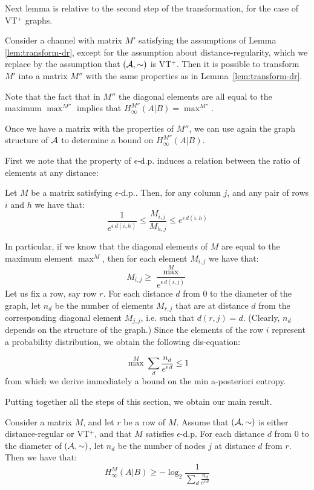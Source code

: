 \documentclass{llncs}
\begin{document}
Next lemma is relative to the second step of the transformation, for the case of VT$^+$ graphs. 
\begin{lemma}\label{lem:transform-vt++}
Consider a channel with matrix $M'$ satisfying the assumptions of Lemma \ref{lem:transform-dr}, except for the assumption about distance-regularity, which we replace by the assumption that $({\cal A}, \sim)$ is VT$^+$. 
Then it is possible to transform $M'$ into a matrix $M''$ with the same properties as in Lemma~\ref{lem:transform-dr}.
\end{lemma}
Note that the fact that in $M''$ the diagonal elements are all equal to the maximum $ \max^{M''}$ implies that $H^{M''}_\infty(A|B) = \max^{M''}$. 

Once we have a matrix with the properties of $M''$, we can use again the graph structure of $\cal A$ to determine a bound on $H^{M''}_\infty(A|B)$. 

First we note that the property of $\epsilon$-d.p. induces a relation between the ratio of elements at any distance: 

\begin{remark}
Let $M$ be a matrix satisfying  $\epsilon$-d.p.. Then, for any column $j$, and any pair of rows $i$ and $h$ we have that:
\[
\frac{1}{e^{\epsilon \,d(i,h)}}\leq \frac{M_{i,j}}{M_{h,j}}\leq e^{\epsilon \,d(i,h)}
\]
\end{remark}
In particular, if we know that the diagonal elements of $M$ are equal to the maximum element $\max^{M}$, then 
for each element $M_{i,j}$ we have that:
\begin{equation}\label{eqn:other-elements}
M_{i,j}\geq \frac{\max^{M}}{\displaystyle e^{\epsilon \,d(i,j)}}
\end{equation}
Let us fix a row, say row $r$. For each distance $d$ from $0$ to the diameter of the graph, let $n_d$ be the number of elements $M_{r,j}$ that are at distance $d$ from the corresponding diagonal element $M_{j,j}$, i.e. such that $d(r,j) = d$. (Clearly, $n_d$ depends on the structure of the graph.) Since the elements of the row $i$ represent a probability distribution, we obtain the following dis-equation: 

\[  {\textstyle \max^{M}} \sum_{d}  \frac{n_d}{e^{\epsilon \,d }} \leq 1\]
from which we derive immediately a bound on the min a-posteriori entropy. 

Putting together all the steps  of this section, we  obtain our main result. 

\begin{theorem}\label{theo:bound}
Consider a matrix $M$, and let $r$ be a row of $M$. Assume that $({\cal A}, \sim)$ is either  distance-regular or VT$^+$, and that $M$ satisfies $\epsilon$-d.p.
For each distance $d$  from $0$ to the diameter of $({\cal A}, \sim)$,  let $n_d$ be the number of nodes $j$ at distance $d$ from $r$. 
Then we have that:
\begin{equation}\label{eqn:bound}
H^{M}_\infty(A|B) \geq - \log_2 \frac{1}{\displaystyle  \sum_{d}  \frac{n_d}{e^{\epsilon \,d }}} 
\end{equation}
\end{theorem}
\end{document}
